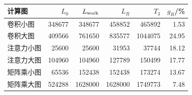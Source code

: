 \begin{tabular}{lrrrrr}\toprule
计算图 & $L_0$ & $L_{\rm work}$ & $L_R$ & $T_3$ & $g_R$/\%\\\midrule
卷积小图 & 348677 & 348677 & 458852 & 465892 & 1.53\\
卷积大图 & 409566 & 761650 & 835577 & 1044075 & 24.95\\
注意力小图 & 25600 & 25600 & 31953 & 37744 & 18.12\\
注意力大图 & 104960 & 104960 & 127789 & 150499 & 17.77\\
矩阵乘小图 & 65536 & 152438 & 152438 & 173274 & 13.67\\
矩阵乘大图 & 524288 & 1628000 & 1628000 & 1749773 & 7.48\\
\bottomrule\end{tabular}
